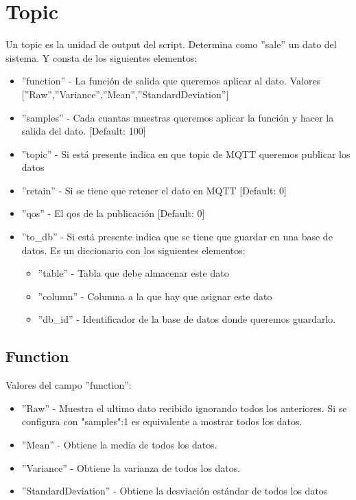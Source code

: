 \documentclass[12pt, a4paper, oneside, titlepage]{article}
\begin{document}
\section{Topic}

Un topic es la unidad de output del script. Determina como ''sale'' un dato del sistema. Y consta de los siguientes elementos:

\begin{itemize}
\item	''function'' - La función de salida que queremos aplicar al dato. Valores [''Raw'',''Variance'',''Mean'',''StandardDeviation'']
\item	''samples'' - Cada cuantas muestras queremos aplicar la función y hacer la salida del dato. [Default: 100]
\item	''topic'' - Si está presente indica en que topic de MQTT queremos publicar los datos
\item	''retain'' - Si se tiene que retener el dato en MQTT [Default: 0]
\item	''qos'' - El qos de la publicación [Default: 0]
\item	''to\_db'' - Si está presente indica que se tiene que guardar en una base de datos. Es un diccionario con los siguientes elementos:
	\begin{itemize}
	\item ''table'' - Tabla que debe almacenar este dato
	\item ''column'' - Columna a la que hay que asignar este dato
	\item ''db\_id'' - Identificador de la base de datos donde queremos guardarlo. 
	\end{itemize}
\end{itemize}



\subsection{Function}
Valores del campo ''function'':
\begin{itemize}
\item ''Raw'' - Muestra el ultimo dato recibido ignorando todos los anteriores. Si se configura con "samples":1 es equivalente a mostrar todos los datos.
\item ''Mean'' - Obtiene la media de todos los datos.
\item ''Variance'' - Obtiene la varianza de todos los datos.
\item ''StandardDeviation'' - Obtiene la desviación estándar de todos los datos
\end{itemize}
\end{document}
